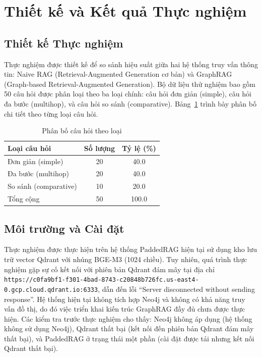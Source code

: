\section{Thiết kế và Kết quả Thực nghiệm}

\subsection{Thiết kế Thực nghiệm}
Thực nghiệm được thiết kế để so sánh hiệu suất giữa hai hệ thống truy vấn thông tin: Naive RAG (Retrieval-Augmented Generation cơ bản) và GraphRAG (Graph-based Retrieval-Augmented Generation). Bộ dữ liệu thử nghiệm bao gồm 50 câu hỏi được phân loại theo ba loại chính: câu hỏi đơn giản (simple), câu hỏi đa bước (multihop), và câu hỏi so sánh (comparative). Bảng~\ref{tab:category_breakdown} trình bày phân bố chi tiết theo từng loại câu hỏi.

\begin{table}[htbp]
\centering
\caption{Phân bố câu hỏi theo loại}
\label{tab:category_breakdown}
\begin{tabular}{lcc}
\toprule
Loại câu hỏi & Số lượng & Tỷ lệ (\%) \\
\midrule
Đơn giản (simple) & 20 & 40.0 \\
Đa bước (multihop) & 20 & 40.0 \\
So sánh (comparative) & 10 & 20.0 \\
\midrule
Tổng cộng & 50 & 100.0 \\
\bottomrule
\end{tabular}
\end{table}

\subsection{Môi trường và Cài đặt}
Thực nghiệm được thực hiện trên hệ thống PaddedRAG hiện tại sử dụng kho lưu trữ vector Qdrant với nhúng BGE-M3 (1024 chiều). Tuy nhiên, quá trình thực nghiệm gặp sự cố kết nối với phiên bản Qdrant đám mây tại địa chỉ \texttt{https://c0fa9bf1-f301-4bad-8743-c20848b726fc.us-east4-0.gcp.cloud.qdrant.io:6333}, dẫn đến lỗi ``Server disconnected without sending response''. Hệ thống hiện tại không tích hợp Neo4j và không có khả năng truy vấn đồ thị, do đó việc triển khai kiến trúc GraphRAG đầy đủ chưa được thực hiện. Các kiểm tra trước thực nghiệm cho thấy: Neo4j không áp dụng (hệ thống không sử dụng Neo4j), Qdrant thất bại (kết nối đến phiên bản Qdrant đám mây thất bại), và PaddedRAG ở trạng thái một phần (cài đặt được tải nhưng kết nối Qdrant thất bại).

